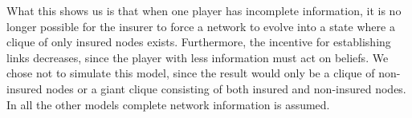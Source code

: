 What this shows us is that when one player has incomplete information, it is no longer possible for the insurer to force a network to evolve into a state where a clique of only insured nodes exists. Furthermore, the incentive for establishing links decreases, since the player with less information must act on beliefs.  
We chose not to simulate this model, since the result would only be a clique of non-insured nodes or a giant clique consisting of both insured and non-insured nodes. 
In all the other models complete network information is assumed. 



